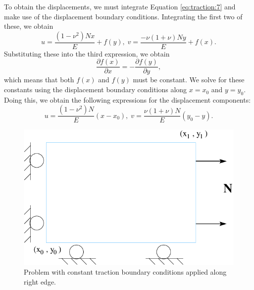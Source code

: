 To obtain the displacements, we must integrate Equation \vref{eq:traction:7}
and make use of the displacement boundary conditions. Integrating
the first two of these, we obtain
\begin{equation}
u=\frac{\left(1-\nu^{2}\right)Nx}{E}+f\left(y\right),\; v=\frac{-\nu\left(1+\nu\right)Ny}{E}+f\left(x\right).\label{eq:traction:8}
\end{equation}
Substituting these into the third expression, we obtain
\begin{equation}
\frac{\partial f\left(x\right)}{\partial x}=-\frac{\partial f\left(y\right)}{\partial y},\label{eq:traction:9}
\end{equation}
which means that both $f\left(x\right)$ and $f\left(y\right)$ must
be constant. We solve for these constants using the displacement boundary
conditions along $x=x_{0}$ and $y=y_{0}$. Doing this, we obtain
the following expressions for the displacement components:
\begin{equation}
u=\frac{\left(1-\nu^{2}\right)N}{E}\left(x-x_{0}\right),\; v=\frac{\nu\left(1+\nu\right)N}{E}\left(y_{0}-y\right).\label{eq:traction:10}
\end{equation}


\noindent \begin{center}
\begin{figure}[H]


\caption{\label{fig:Const-tractions}Problem with constant traction boundary
conditions applied along right edge.}


\noindent \centering{}\includegraphics{analyticalsolns/figs/consttract}
\end{figure}

\par\end{center}
